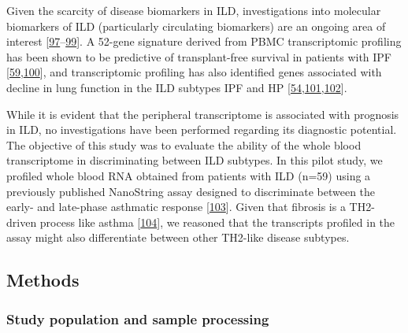 \documentclass[
]{article}
\begin{document}
Given the scarcity of disease biomarkers in ILD, investigations into molecular biomarkers of ILD (particularly circulating biomarkers) are an ongoing area of interest {[}\protect\hyperlink{ref-clynick_biomarker_2022}{97}--\protect\hyperlink{ref-bowman_proteomic_2022}{99}{]}. A 52-gene signature derived from PBMC transcriptomic profiling has been shown to be predictive of transplant-free survival in patients with IPF {[}\protect\hyperlink{ref-herazo-maya_peripheral_2013}{59},\protect\hyperlink{ref-herazo-maya_validating_2017}{100}{]}, and transcriptomic profiling has also identified genes associated with decline in lung function in the ILD subtypes IPF and HP {[}\protect\hyperlink{ref-yang_peripheral_2012}{54},\protect\hyperlink{ref-huang_blood_2021}{101},\protect\hyperlink{ref-fernandez_perez_prognostic_2022}{102}{]}.

While it is evident that the peripheral transcriptome is associated with prognosis in ILD, no investigations have been performed regarding its diagnostic potential. The objective of this study was to evaluate the ability of the whole blood transcriptome in discriminating between ILD subtypes. In this pilot study, we profiled whole blood RNA obtained from patients with ILD (n=59) using a previously published NanoString assay designed to discriminate between the early- and late-phase asthmatic response {[}\protect\hyperlink{ref-singh_novel_2018}{103}{]}. Given that fibrosis is a TH2-driven process like asthma {[}\protect\hyperlink{ref-spagnolo_role_2022}{104}{]}, we reasoned that the transcripts profiled in the assay might also differentiate between other TH2-like disease subtypes.

\hypertarget{methods-1}{%
\subsection{Methods}\label{methods-1}}

\hypertarget{study-population-and-sample-processing}{%
\subsubsection{Study population and sample processing}\label{study-population-and-sample-processing}}
\end{document}

